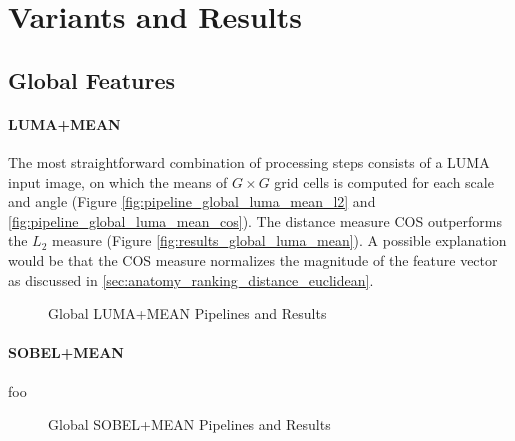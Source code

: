\section{Variants and Results}\label{sec:results}

\subsection{Global Features}

\paragraph{LUMA+MEAN}

The most straightforward combination of processing steps consists of a LUMA
input image, on which the means of $G \times G$ grid cells is computed for each
scale and angle (Figure \ref{fig:pipeline_global_luma_mean_l2} and
\ref{fig:pipeline_global_luma_mean_cos}). The distance measure COS outperforms
the $L_2$ measure (Figure \ref{fig:results_global_luma_mean}). A possible
explanation would be that the COS measure normalizes the magnitude of the
feature vector as discussed in \ref{sec:anatomy_ranking_distance_euclidean}.

\begin{figure}[h]
    \centering
    \quad
    \quad
    \caption[Global LUMA+MEAN Pipelines and Results]{
        Global LUMA+MEAN Pipelines and Results
    }
    \label{fig:pipeline_global_luma_mean}
\end{figure}

\paragraph{SOBEL+MEAN}

foo

\begin{figure}[h]
    \centering
    \quad
    \quad
    \caption[Global SOBEL+MEAN Pipelines and Results]{
        Global SOBEL+MEAN Pipelines and Results
    }
    \label{fig:pipeline_global_luma_sobel_mean}
\end{figure}

